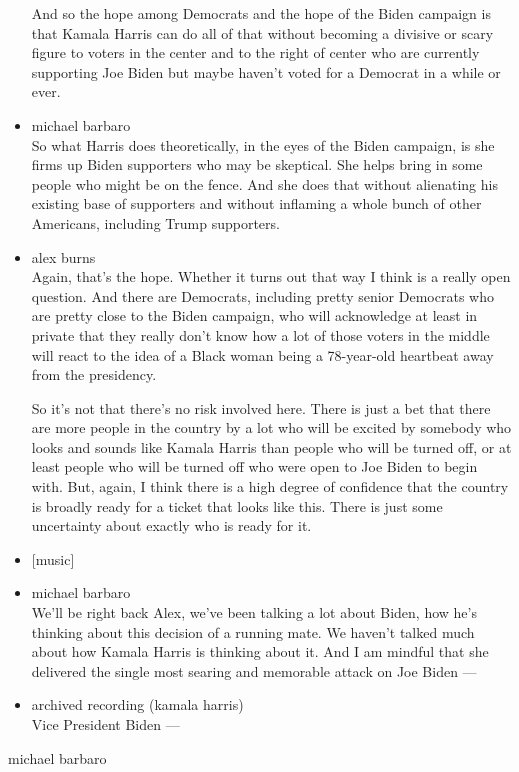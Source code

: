 \begin{itemize}
  And so the hope among Democrats and the hope of the Biden campaign is
  that Kamala Harris can do all of that without becoming a divisive or
  scary figure to voters in the center and to the right of center who
  are currently supporting Joe Biden but maybe haven't voted for a
  Democrat in a while or ever.
\item
  michael barbaro\\
  So what Harris does theoretically, in the eyes of the Biden campaign,
  is she firms up Biden supporters who may be skeptical. She helps bring
  in some people who might be on the fence. And she does that without
  alienating his existing base of supporters and without inflaming a
  whole bunch of other Americans, including Trump supporters.
\item
  alex burns\\
  Again, that's the hope. Whether it turns out that way I think is a
  really open question. And there are Democrats, including pretty senior
  Democrats who are pretty close to the Biden campaign, who will
  acknowledge at least in private that they really don't know how a lot
  of those voters in the middle will react to the idea of a Black woman
  being a 78-year-old heartbeat away from the presidency.

  So it's not that there's no risk involved here. There is just a bet
  that there are more people in the country by a lot who will be excited
  by somebody who looks and sounds like Kamala Harris than people who
  will be turned off, or at least people who will be turned off who were
  open to Joe Biden to begin with. But, again, I think there is a high
  degree of confidence that the country is broadly ready for a ticket
  that looks like this. There is just some uncertainty about exactly who
  is ready for it.
\item
  {[}music{]}
\item
  michael barbaro\\
  We'll be right back Alex, we've been talking a lot about Biden, how
  he's thinking about this decision of a running mate. We haven't talked
  much about how Kamala Harris is thinking about it. And I am mindful
  that she delivered the single most searing and memorable attack on Joe
  Biden ---
\item
  archived recording (kamala harris)\\
  Vice President Biden ---
\end{itemize}

michael barbaro

